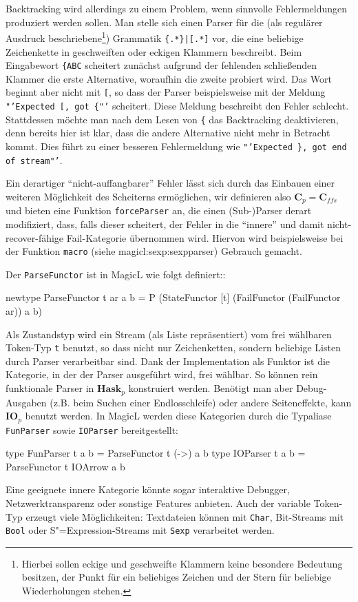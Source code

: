 \documentclass[12pt, a4paper, bibgerm]{scrbook}
\newenvironment{DIFnomarkup}{}{}
\newcommand\icode[1]{\lstinline?#1?}
\newcommand\sref{}
\newcommand{\sees}[1]{(siehe \sref{#1})}
\newcommand{\sexp}{S"=Expression}
\begin{document}
Backtracking wird allerdings zu einem Problem, wenn sinnvolle
Fehlermeldungen produziert werden sollen. Man stelle sich einen Parser
für die (als regulärer Ausdruck beschriebene\footnote{Hierbei sollen
  eckige und geschweifte Klammern keine besondere Bedeutung besitzen,
  der Punkt für ein beliebiges Zeichen und der Stern für beliebige
  Wiederholungen stehen.})
Grammatik \texttt{\{.*\}|[.*]} vor, die eine
beliebige Zeichenkette in geschweiften oder eckigen Klammern
beschreibt. Beim Eingabewort \texttt{\{ABC} scheitert zunächst aufgrund
der fehlenden schließenden Klammer die erste Alternative, woraufhin die
zweite probiert wird. Das Wort beginnt aber nicht mit \texttt{[}, so
dass der Parser beispielsweise mit der Meldung \texttt{"'Expected [,
  got \{"'}
scheitert. Diese Meldung beschreibt den Fehler schlecht.
Stattdessen möchte man nach dem Lesen von \texttt{\{} das
Backtracking deaktivieren, denn bereits hier ist klar, dass die
andere Alternative nicht mehr in Betracht kommt. Dies führt zu einer
besseren Fehlermeldung wie \texttt{"'Expected \}, got end of
  stream"'}.

Ein derartiger "`nicht-auffangbarer"' Fehler lässt sich durch das
Einbauen einer weiteren Möglichkeit des Scheiterns ermöglichen, wir
definieren also $\mathbf{C}_p = \mathbf{C}_{ffs}$ und bieten eine
Funktion \icode{forceParser} an, die einen (Sub-)Parser derart
modifiziert, dass, falls dieser scheitert, der Fehler in die "`innere"'
und damit nicht-recover-fähige Fail-Kategorie übernommen wird. Hiervon
wird beispielsweise bei der Funktion \icode{macro}
\sees{magicl:sexp:sexpparser} Gebrauch gemacht.

Der \icode{ParseFunctor} ist in MagicL wie folgt definiert::
\begin{DIFnomarkup}\begin{code}
newtype ParseFunctor t ar a b =
  P (StateFunctor
     [t]
     (FailFunctor (FailFunctor ar))
     a
     b)
\end{code}\end{DIFnomarkup}
Als Zustandstyp wird ein Stream (als Liste repräsentiert) vom frei
wählbaren Token-Typ \icode{t} benutzt, so dass nicht nur Zeichenketten,
sondern beliebige Listen durch Parser verarbeitbar sind.  Dank der
Implementation als Funktor ist die Kategorie, in der der Parser
ausgeführt wird, frei wählbar. So können rein funktionale Parser in
$\mathbf{Hask}_p$ konstruiert werden. Benötigt man
aber Debug-Ausgaben (z.B. beim Suchen einer Endlosschleife) oder andere
Seiteneffekte, kann $\mathbf{IO}_p$ benutzt werden. In MagicL werden
diese Kategorien durch die Typaliase \icode{FunParser} sowie
\icode{IOParser} bereitgestellt:
\begin{DIFnomarkup}\begin{code}
type FunParser t a b = ParseFunctor t (->) a b
type IOParser  t a b = ParseFunctor t IOArrow a b
\end{code}\end{DIFnomarkup}
Eine geeignete innere Kategorie könnte
sogar interaktive Debugger, Netzwerktransparenz oder sonstige Features
anbieten. Auch der variable Token-Typ erzeugt viele Möglichkeiten:
Textdateien können mit \icode{Char}, Bit-Streams mit \icode{Bool} oder
\sexp{}-Streams mit \icode{Sexp} verarbeitet werden.
\end{document}
